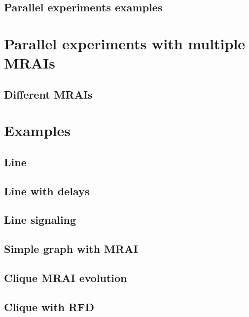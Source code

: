 \documentclass[10pt,journal,onecolumn]{IEEEtran}
\begin{document}
\subsection{Parallel experiments examples}
\label{subsec:parallel_examples}

\section{Parallel experiments with multiple MRAIs}
\label{sec:parallel_mrais}

\subsection{Different MRAIs}
\label{subsec:MRAI_types}

\section{Examples}
\label{sec:examples}

\subsection{Line}
\label{subsec:ex_line}

\subsection{Line with delays}
\label{subsec:ex_line_delay}

\subsection{Line signaling}
\label{subsec:ex_line_signaling}

\subsection{Simple graph with MRAI}
\label{subsec:simple_graph_with_MRAI}

\subsection{Clique MRAI evolution}
\label{subsec:clique_evolution}

\subsection{Clique with RFD}
\label{subsec:clique_rfd}
\end{document}
